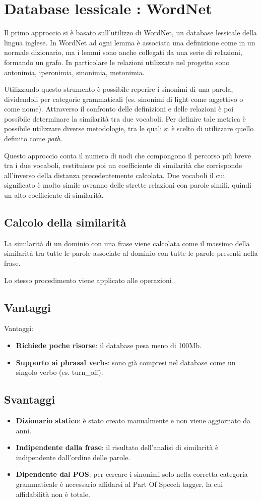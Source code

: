 \documentclass[twoside]{supsistudent}
\begin{document}
\section{Database lessicale : WordNet}
Il primo approccio si è basato sull'utilizzo di WordNet, un database lessicale della lingua inglese.
In WordNet ad ogni lemma è associata una definizione come in un normale dizionario, ma i lemmi sono anche collegati da una serie di relazioni, formando un grafo. In particolare le relazioni utilizzate nel progetto sono antonimia, iperonimia, sinonimia, metonimia.\cite{wordNet}

Utilizzando questo strumento è possibile reperire i sinonimi di una parola, dividendoli per categorie grammaticali (es. sinonimi di light come aggettivo o come nome).
Attraverso il confronto delle definizioni e delle relazioni è poi possibile determinare la similarità tra due vocaboli. Per definire tale metrica è possibile utilizzare diverse metodologie, tra le quali si è scelto di utilizzare quello definito come \textit{path}. \cite{wordNetWordSimilarity}

Questo approccio conta il numero di nodi che compongono il percorso più breve tra i due vocaboli, restituisce poi un coefficiente di similarità che corrisponde all'inverso della distanza precedentemente calcolata. Due vocaboli il cui significato è molto simile avranno delle strette relazioni con parole simili, quindi un alto coefficiente di similarità.\cite{wordNetPathSimilarity}
\subsection{Calcolo della similarità}
La similarità di un dominio con una frase viene calcolata come il massimo della similarità tra tutte le parole associate al dominio con tutte le parole presenti nella frase.

Lo stesso procedimento viene applicato alle operazioni .
\subsection{Vantaggi}
Vantaggi:
 \begin{itemize}
  \item \textbf{Richiede poche risorse}: il database pesa meno di 100Mb.
  \item \textbf{Supporto ai phrasal verbs}: sono già compresi nel database come un singolo verbo (es. turn\_off).
\end{itemize}
\subsection{Svantaggi}
\begin{itemize}
  \item \textbf{Dizionario statico}: è stato creato manualmente e non viene aggiornato da anni.  
  \item \textbf{Indipendente dalla frase}: il risultato dell'analisi di similarità è indipendente dall'ordine delle parole.
  \item \textbf{Dipendente dal POS}: per cercare i sinonimi solo nella corretta categoria grammaticale è necessario affidarsi al Part Of Speech tagger, la cui affidabilità non è totale.
\end{itemize}
\newpage
\end{document}
